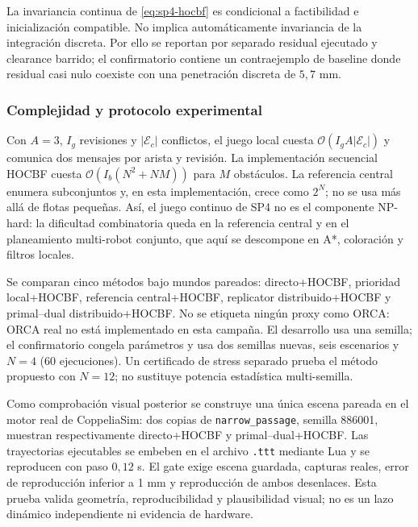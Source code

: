 La invariancia continua de \eqref{eq:sp4-hocbf} es condicional a factibilidad e
inicialización compatible. No implica automáticamente invariancia de la integración
discreta. Por ello se reportan por separado residual ejecutado y clearance barrido; el
confirmatorio contiene un contraejemplo de baseline donde residual casi nulo coexiste
con una penetración discreta de $5{,}7$ mm.

\subsubsection{Complejidad y protocolo experimental}

Con $A=3$, $I_g$ revisiones y $|\mathcal E_c|$ conflictos, el juego local cuesta
$\mathcal O(I_gA|\mathcal E_c|)$ y comunica dos mensajes por arista y revisión. La
implementación secuencial HOCBF cuesta
$\mathcal O(I_b(N^2+NM))$ para $M$ obstáculos. La referencia central enumera subconjuntos
y, en esta implementación, crece como $2^N$; no se usa más allá de flotas pequeñas.
Así, el juego continuo de SP4 no es el componente NP-hard: la dificultad combinatoria
queda en la referencia central y en el planeamiento multi-robot conjunto, que aquí se
descompone en A*, coloración y filtros locales.

Se comparan cinco métodos bajo mundos pareados: directo+HOCBF, prioridad local+HOCBF,
referencia central+HOCBF, replicator distribuido+HOCBF y primal--dual distribuido+HOCBF.
No se etiqueta ningún proxy como ORCA: ORCA real no está implementado en esta campaña.
El desarrollo usa una semilla; el confirmatorio congela parámetros y usa dos semillas
nuevas, seis escenarios y $N=4$ (60 ejecuciones). Un certificado de stress separado
prueba el método propuesto con $N=12$; no sustituye potencia estadística multi-semilla.

Como comprobación visual posterior se construye una única escena pareada en el motor
real de CoppeliaSim: dos copias de \texttt{narrow\_passage}, semilla 886001, muestran
respectivamente directo+HOCBF y primal--dual+HOCBF. Las trayectorias ejecutables se
embeben en el archivo \texttt{.ttt} mediante Lua y se reproducen con paso $0{,}12$ s.
El gate exige escena guardada, capturas reales, error de reproducción inferior a 1 mm y
reproducción de ambos desenlaces. Esta prueba valida geometría, reproducibilidad y
plausibilidad visual; no es un lazo dinámico independiente ni evidencia de hardware.